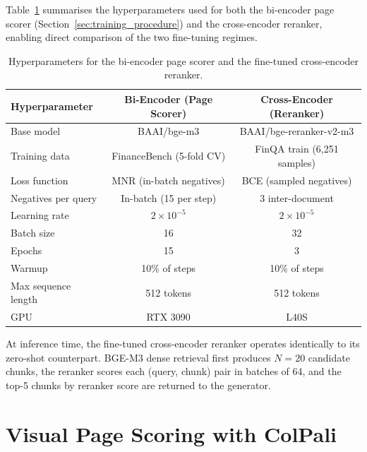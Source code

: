 \documentclass[12pt,twoside,maitrise]{dms}
\theoremstyle{definition}
\numberwithin{equation}{section}
\numberwithin{table}{chapter}
\numberwithin{figure}{chapter}
\begin{document}
Table~\ref{tab:ft_reranker_training} summarises the hyperparameters used for both the
bi-encoder page scorer (Section~\ref{sec:training_procedure}) and the cross-encoder
reranker, enabling direct comparison of the two fine-tuning regimes.

\begin{table}[ht]
\centering
\caption{Hyperparameters for the bi-encoder page scorer and the fine-tuned cross-encoder
  reranker.}
\label{tab:ft_reranker_training}
\small
\begin{tabular}{lcc}
\toprule
\textbf{Hyperparameter} & \textbf{Bi-Encoder (Page Scorer)} & \textbf{Cross-Encoder (Reranker)} \\
\midrule
Base model          & BAAI/bge-m3              & BAAI/bge-reranker-v2-m3 \\
Training data       & FinanceBench (5-fold CV) & FinQA train (6,251 samples) \\
Loss function       & MNR (in-batch negatives) & BCE (sampled negatives) \\
Negatives per query & In-batch (15 per step)   & 3 inter-document \\
Learning rate       & $2 \times 10^{-5}$       & $2 \times 10^{-5}$ \\
Batch size          & 16                       & 32 \\
Epochs              & 15                       & 3 \\
Warmup              & 10\% of steps            & 10\% of steps \\
Max sequence length & 512 tokens               & 512 tokens \\
GPU                 & RTX 3090                 & L40S \\
\bottomrule
\end{tabular}
\end{table}

At inference time, the fine-tuned cross-encoder reranker operates identically to its
zero-shot counterpart. BGE-M3 dense retrieval first produces $N=20$ candidate chunks, the
reranker scores each (query, chunk) pair in batches of 64, and the top-5 chunks by
reranker score are returned to the generator.

\section{Visual Page Scoring with ColPali}
\label{sec:method_colpali}
\end{document}
